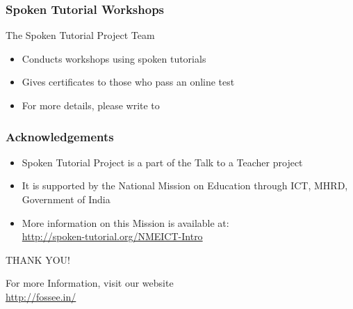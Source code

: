 \documentclass[17pt,compress]{beamer}
\begin{document}
\begin{frame}
\frametitle{Spoken Tutorial Workshops}The Spoken Tutorial Project Team 
\begin{itemize}
\item Conducts workshops using spoken tutorials 
\item Gives certificates to those who pass an online test 
\item For more details, please write to \\ 
\end{itemize}
\end{frame}

\begin{frame}
\frametitle{Acknowledgements}
\begin{itemize}
\item Spoken Tutorial Project is a part of the Talk to a Teacher  project 
\item It is supported by the National Mission on Education through  ICT, MHRD, Government of India 
\item More information on this Mission is available at: \\{\color{blue}\url{http://spoken-tutorial.org/NMEICT-Intro}}
\end{itemize}
\end{frame}

\begin{frame}

  \begin{block}{}
  \begin{center}
  {\Large THANK YOU!} 
  \end{center}
  \end{block}
\begin{block}{}
  \begin{center}
    For more Information, visit our website\\
    {\color{blue}\url{http://fossee.in/}}
  \end{center}  
  \end{block}
\end{frame}
\end{document}
